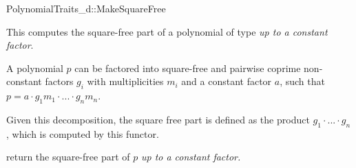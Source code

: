\begin{ccRefConcept}{PolynomialTraits_d::MakeSquareFree}
\ccDefinition

This  computes the square-free part of 
a polynomial of type   
{\em up to a constant factor}.  

A polynomial $p$ can be  factored into square-free and pairwise coprime 
non-constant factors $g_i$ with multiplicities $m_i$ and a constant factor $a$, 
such that $p = a  \cdot  g_1m_1  \cdot  ...  \cdot  g_nm_n$.

Given this decomposition, the square free part is defined as the product $g_1  \cdot  ...  \cdot  g_n$, 
which is computed by this functor. 

\ccRefines 
{}

\ccTypes

\ccGlue
{}

\ccOperations
{}
         { return the square-free part of $p$ {\em up to a constant factor.} }



\ccSeeAlso

\\
\end{ccRefConcept}

